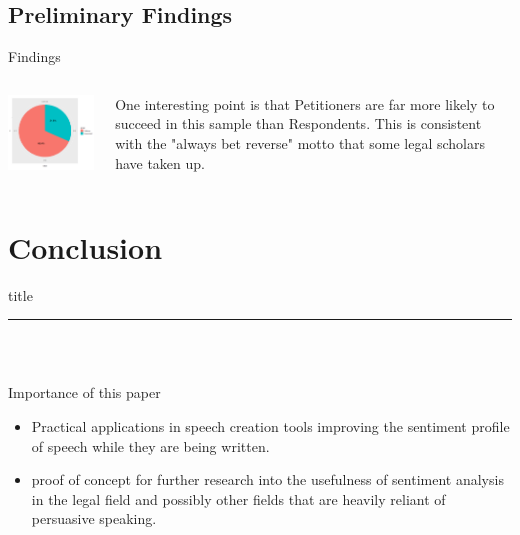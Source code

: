 \documentclass{beamer}
\begin{document}
\subsection{Preliminary Findings}
\begin{frame}{Findings}
\begin{columns}
\begin{column}{.6\textwidth}
\includegraphics[width=7cm]{Piechartofcaseoutcomes.png}
\end{column}
\begin{column}{.4\textwidth}
One interesting point is that Petitioners are far more likely to succeed in this sample than Respondents. This is consistent with the "always bet reverse" motto that some legal scholars have taken up.

\end{column}
\end{columns}
\end{frame}

\section{Conclusion}
    \begin{frame}{}
        \vfill
      \centering
      \begin{beamercolorbox}[sep=8pt,center,shadow=true,rounded=true]{title}
        \insertsectionhead\par%
        \color{oxfordblue}\noindent\rule{10cm}{1pt} \\
      \end{beamercolorbox}
      \vfill
  \end{frame}
  
\subsection{}
\begin{frame}{Importance of this paper}
\begin{itemize}
\item Practical applications in speech creation tools improving the sentiment profile of speech while they are being written.
\item proof of concept for further research into the usefulness of sentiment analysis in the legal field and possibly other fields that are heavily reliant of persuasive speaking. 
\end{itemize}
\end{frame}
\end{document}

